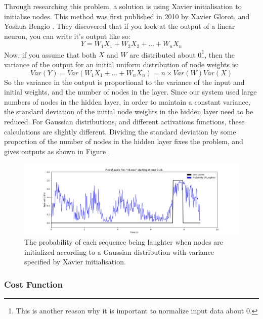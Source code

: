 \documentclass[a4paper,11pt,notitlepage]{article}
\begin{document}
\noindent
Through researching this problem, a solution is using Xavier initialisation to initialise nodes. This method was first published in 2010 by Xavier Glorot, and Yoshua Bengio \cite{glorot2010understanding}. They discovered that if you look at the output of a linear neuron, you can write it's output like so:
\begin{equation}
Y = W_{1}X_{1} + W_{2}X_{2} + \ldots + W_{n}X_{n}
\end{equation}
Now, if you assume that both $X$ and $W$ are distributed about 0\footnote{This is another reason why it is important to normalize input data about 0.}, then the variance of the output for an initial uniform distribution of node weights is:
\begin{equation}
Var(Y) = Var(W_{1}X_{1} + \ldots + W_{n}X_{n}) = n\times Var(W)Var(X)
\end{equation}
So the variance in the output is proportional to the variance of the input and initial weights, and the number of nodes in the layer. Since our system used large numbers of nodes in the hidden layer, in order to maintain a constant variance, the standard deviation of the initial node weights in the hidden layer need to be reduced. For Gaussian distributions, and different activations functions, these calculations are slightly different. Dividing the standard deviation by some proportion of the number of nodes in the hidden layer fixes the problem, and gives outputs as shown in Figure .

\begin{figure}[H]
	\centering
	\vspace{0.5cm}
	\includegraphics[scale = 0.4]{figs/good_initialisation1.png}
	\caption{The probability of each sequence being laughter when nodes are initialized according to a Gaussian distribution with variance specified by Xavier initialisation.}
	\label{good_initialisation1}
\end{figure}

\subsubsection{Cost Function}
\end{document}

